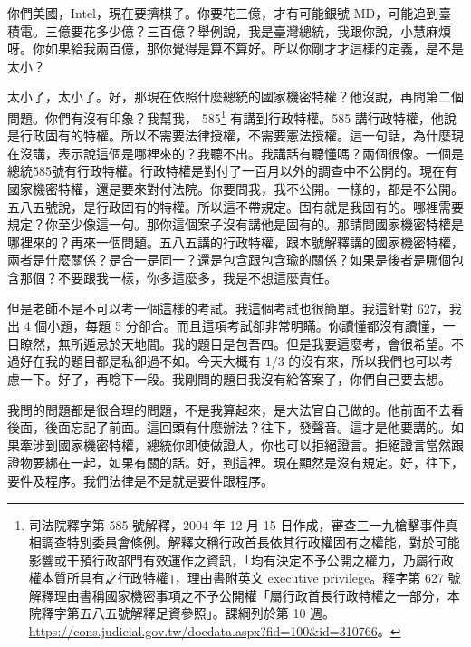 \hypertarget{c11:cue:209}{}你們美國，Intel，現在要擠棋子。你要花三億，才有可能銀號 MD，可能追到臺積電。三億要花多少億？三百億？舉例說，我是臺灣總統，我跟你說，小慧麻煩呀。你如果給我兩百億，那你覺得是算不算好。所以你剛才才這樣的定義，是不是太小？

\hypertarget{c11:cue:210}{}太小了，太小了。好，那現在依照什麼總統的國家機密特權？他沒說，再問第二個問題。你們有沒有印象？我幫我，
\hypertarget{c11:cue:211}{}585\footnote{司法院釋字第 585 號解釋，2004 年 12 月 15 日作成，審查三一九槍擊事件真相調查特別委員會條例。解釋文稱行政首長依其行政權固有之權能，對於可能影響或干預行政部門有效運作之資訊，「均有決定不予公開之權力，乃屬行政權本質所具有之行政特權」，理由書附英文 executive privilege。釋字第 627 號解釋理由書稱國家機密事項之不予公開權「屬行政首長行政特權之一部分，本院釋字第五八五號解釋足資參照」。課綱列於第 10 週。\url{https://cons.judicial.gov.tw/docdata.aspx?fid=100&id=310766}。} 有講到行政特權。585 講行政特權，他說是行政固有的特權。所以不需要法律授權，不需要憲法授權。這一句話，為什麼現在沒講，表示說這個是哪裡來的？我聽不出。我講話有聽懂嗎？兩個很像。一個是總統585號有行政特權。行政特權是對付了一百月以外的調查中不公開的。現在有國家機密特權，還是要來對付法院。你要問我，我不公開。一樣的，都是不公開。
\hypertarget{c11:cue:212}{}五八五號說，是行政固有的特權。所以這不帶規定。固有就是我固有的。哪裡需要規定？你至少像這一句。那你這個案子沒有講他是固有的。那請問國家機密特權是哪裡來的？再來一個問題。五八五講的行政特權，跟本號解釋講的國家機密特權，兩者是什麼關係？是合一是同一？還是包含跟包含瑜的關係？如果是後者是哪個包含那個？不要跟我一樣，你多這麼多，我是不想這麼責任。

\hypertarget{c11:cue:213}{}但是老師不是不可以考一個這樣的考試。我這個考試也很簡單。我這針對 627，我出 4 個小題，每題 5 分卻合。而且這項考試卻非常明瞞。你讀懂都沒有讀懂，一目瞭然，無所遁忌於天地間。我的題目是包吾四。但是我要這麼考，會很希望。不過好在我的題目都是私卻過不如。今天大概有 1/3 的沒有來，所以我們也可以考慮一下。好了，再唸下一段。我剛問的題目我沒有給答案了，你們自己要去想。

\hypertarget{c11:cue:214}{}我問的問題都是很合理的問題，不是我算起來，是大法官自己做的。他前面不去看後面，後面忘記了前面。這回頭有什麼辦法？往下，發聲音。這才是他要講的。如果牽涉到國家機密特權，總統你即使做證人，你也可以拒絕證言。拒絕證言當然跟證物要綁在一起，如果有關的話。好，到這裡。現在顯然是沒有規定。好，往下，要件及程序。我們法律是不是就是要件跟程序。

